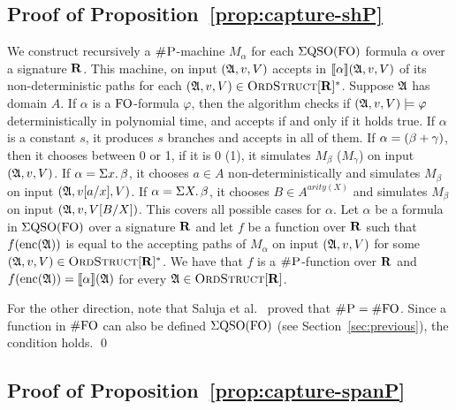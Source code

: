 
\medskip

\subsection*{Proof of Proposition~\ref{prop:capture-shP}}

We construct recursively a $\text{\sc \#P}$-machine $M_{\alpha}$ for each $\Sigma{\rm QSO}({\rm FO})$ formula $\alpha$ over a signature $\mathbf{R}$. This machine, on input $(\mathfrak{A},v,V)$ accepts in ${\llbracket{}{\alpha}\rrbracket}(\mathfrak{A},v,V)$ of its non-deterministic paths for each $(\mathfrak{A},v,V) \in \text{\sc OrdStruct}[\mathbf{R}]^*$. Suppose $\mathfrak{A}$ has domain $A$. If $\alpha$ is a ${\rm FO}$-formula $\varphi$, then the algorithm checks if $(\mathfrak{A},v,V)\models\varphi$ deterministically in polynomial time, and accepts if and only if it holds true. If $\alpha$ is a constant $s$, it produces $s$ branches and accepts in all of them. If $\alpha = (\beta + \gamma)$, then it chooses between 0 or 1, if it is 0 (1), it simulates $M_{\beta}$ ($M_{\gamma}$) on input $(\mathfrak{A},v,V)$. 
If $\alpha = \Sigma{x}.\,\beta$, it chooses $a\in A$ non-deterministically and simulates $M_{\beta}$ on input $(\mathfrak{A},v[a/x],V)$.
If $\alpha = \Sigma{X}.\,\beta$, it chooses $B\in A^{arity(X)}$ and simulates $M_{\beta}$ on input $(\mathfrak{A},v,V[B/X])$. This covers all possible cases for $\alpha$. Let $\alpha$ be a formula in $\Sigma{\rm QSO}({\rm FO})$ over a signature $\mathbf{R}$ and let $f$ be a function over $\mathbf{R}$ such that $f({\rm enc}(\mathfrak{A}))$ is equal to the accepting paths of $M_{\alpha}$ on input $(\mathfrak{A},v,V)$ for some $(\mathfrak{A},v,V) \in \text{\sc OrdStruct}[\mathbf{R}]^*$. We have that $f$ is a $\text{\sc \#P}$-function over $\mathbf{R}$ and $f({\rm enc}(\mathfrak{A})) = {\llbracket{}{\alpha}\rrbracket}(\mathfrak{A})$ for every $\mathfrak{A}\in\text{\sc OrdStruct}[\mathbf{R}]$.

For the other direction, note that Saluja et al.~\cite{SalujaST95} proved that $\text{\sc \#P} = \#{\rm FO}$. 
Since a function in $\#{\rm FO}$ can also be defined $\Sigma{\rm QSO}({\rm FO})$ (see Section~\ref{sec:previous}), the condition holds. \qed

\medskip

\subsection*{Proof of Proposition~\ref{prop:capture-spanP}}

